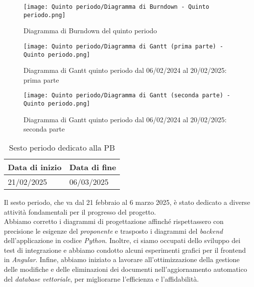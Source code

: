 \newpage
\begin{figure}[h] 
    \centering
    \texttt{[image: Quinto periodo/Diagramma di Burndown - Quinto periodo.png]}
    \caption{Diagramma di Burndown del quinto periodo} 
    \label{fig: Diagramma di Burndown del quinto periodo}
\end{figure}
\newpage
\begin{figure}[h] 
    \centering
    \texttt{[image: Quinto periodo/Diagramma di Gantt (prima parte) - Quinto periodo.png]}
    \caption{Diagramma di Gantt quinto periodo dal 06/02/2024 al 20/02/2025: prima parte} 
    \label{fig: Diagramma di Gantt quinto periodo dal 06/02/2024 al 20/02/2025: prima parte}
\end{figure}
\newpage
\begin{figure}[h] 
    \centering
    \texttt{[image: Quinto periodo/Diagramma di Gantt (seconda parte) - Quinto periodo.png]}
    \caption{Diagramma di Gantt quinto periodo dal 06/02/2024 al 20/02/2025: seconda parte} 
    \label{fig: Diagramma di Gantt quinto periodo dal 06/02/2024 al 20/02/2025: seconda parte}
\end{figure}

\newpage


\label{sec:sesto periodo}
\begin{table}[h!]
    \centering
    \renewcommand{\arraystretch}{1.5} %
    \begin{tabularx}{\textwidth}{|X|X|}\hline
    \rowcolor[HTML]{FFD700} 
    \textbf{Data di inizio} & \textbf{Data di fine} \\ \hline
    21/02/2025 & 06/03/2025 \\ \hline
    \end{tabularx}
    \caption{Sesto periodo dedicato alla PB}
\end{table}
Il sesto periodo, che va dal 21 febbraio al 6 marzo 2025, è stato dedicato a diverse attività fondamentali per il progresso del progetto.\\
Abbiamo corretto i diagrammi di progettazione affinché rispettassero con precisione le esigenze del \emph{proponente} e trasposto i diagrammi del \emph{backend} dell'applicazione in codice \emph{Python}. Inoltre, ci siamo occupati dello sviluppo dei test di integrazione e abbiamo condotto alcuni esperimenti grafici per il frontend in \emph{Angular}. 
Infine, abbiamo iniziato a lavorare all'ottimizzazione della gestione delle modifiche e delle eliminazioni dei documenti nell'aggiornamento automatico del \emph{database vettoriale}, per migliorarne l'efficienza e l'affidabilità.

